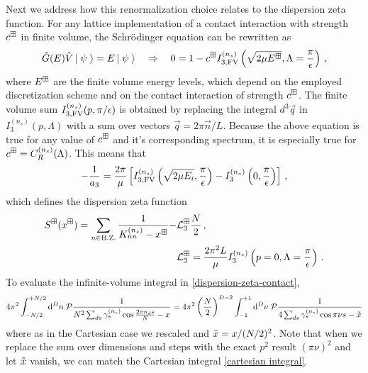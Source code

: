 Next we address how this renormalization choice relates to the dispersion zeta function.
For any lattice implementation of a contact interaction with strength $c^\boxplus$ in finite volume, the Schrödinger equation can be rewritten as
\begin{equation}
	\hat G(E) \hat V \left|\;\psi\;\right\rangle = E\left|\;\psi\;\right\rangle
	\quad \Rightarrow \quad
	0 = 1 - c^\boxplus I_{3, \textrm{FV}}^{(n_s)}\left(\sqrt{2 \mu E^\boxplus}, \Lambda = \frac{\pi}{\epsilon}\right) \, ,
\end{equation}
where $E^\boxplus$ are the finite volume energy levels, which depend on the employed discretization scheme and on the contact interaction of strength $c^\boxplus$.
The finite volume sum $I_{3, \textrm{FV}}^{(n_s)}(p, \pi/\epsilon)$ is obtained by replacing the integral $d^3 \vec q$ in $I_3^{(n_s)}(p, \Lambda)$ with a sum  over vectors $\vec q = 2 \pi \vec n / L$.
Because the above equation is true for any value of $c^\boxplus$ and it's corresponding spectrum, it is especially true for $c^\boxplus = C_R^{(n_s)}(\Lambda)$.
This means that
\begin{equation}
	- \frac{1}{a_3}
	=
	\frac{2 \pi}{\mu}
		\left[
		I_{3, \textrm{FV}}^{(n_s)}\left(\sqrt{2 \mu E_i}, \frac{\pi}{\epsilon}\right)
		- I_3^{(n_s)}\left(0, \frac{\pi}{\epsilon}\right)
		\right]
	\, ,
\end{equation}
which defines the dispersion zeta function
\begin{align}\label{eq:dispersion-zeta-contact}
	S^{\boxplus}(x^\boxplus)
	=
	\sum\limits_{n \in \text{B.Z.}}
	\frac{1}{K_{nn}^{(n_s)} - x^\boxplus} - &\mathcal{L}_3^{\boxplus} \frac{N}{2}
	\, ,
	\\
	&\mathcal{L}_3^\boxplus
	=
	\frac{2 \pi^2 L}{\mu}
	I_3^{(n_s)}\left(p=0, \Lambda = \frac{\pi}{\epsilon}\right)
	\, .
\end{align}
To evaluate the infinite-volume integral in \eqref{dispersion-zeta-contact},
\begin{equation}
    4\pi^2 \int_{-N/2}^{+N/2} \mathrm{d}^Dn\; \mathcal{P} \frac{1}{N^2 \sum_{ds} \gamma^{({n_s})}_s \cos \frac{2\pi n_d s}{N} - x}
    =
    4\pi^2 \left(\frac{N}{2}\right)^{D-2} \int_{-1}^{+1} \mathrm{d}^D\nu\; \mathcal{P} \frac{1}{4\sum_{ds} \gamma^{({n_s})}_s \cos \pi \nu s - \tilde{x}}
\end{equation}
where as in the Cartesian case we rescaled and $\tilde{x} = x/(N/2)^2$.
Note that when we replace the sum over dimensions and steps with the exact $p^2$ result $(\pi \nu)^2$ and let $\tilde{x}$ vanish, we can match the Cartesian integral \eqref{cartesian integral}.


